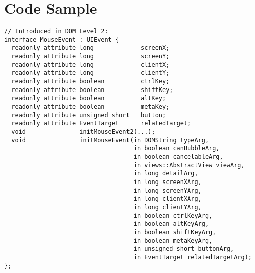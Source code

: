\chapter{Code Sample}

\begin{verbatim}
// Introduced in DOM Level 2:
interface MouseEvent : UIEvent {
  readonly attribute long             screenX;
  readonly attribute long             screenY;
  readonly attribute long             clientX;
  readonly attribute long             clientY;
  readonly attribute boolean          ctrlKey;
  readonly attribute boolean          shiftKey;
  readonly attribute boolean          altKey;
  readonly attribute boolean          metaKey;
  readonly attribute unsigned short   button;
  readonly attribute EventTarget      relatedTarget;
  void               initMouseEvent2(...);
  void               initMouseEvent(in DOMString typeArg, 
                                    in boolean canBubbleArg, 
                                    in boolean cancelableArg, 
                                    in views::AbstractView viewArg, 
                                    in long detailArg, 
                                    in long screenXArg, 
                                    in long screenYArg, 
                                    in long clientXArg, 
                                    in long clientYArg, 
                                    in boolean ctrlKeyArg, 
                                    in boolean altKeyArg, 
                                    in boolean shiftKeyArg, 
                                    in boolean metaKeyArg, 
                                    in unsigned short buttonArg, 
                                    in EventTarget relatedTargetArg);
};
\end{verbatim}
